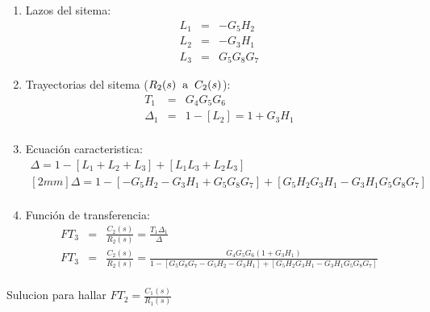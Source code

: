 \documentclass[12pt]{article}
\begin{document}
\begin{enumerate}
  \item Lazos del sitema:
    \begin{eqnarray*}
      L_{1} &=& - G_{5}H_{2} \\
      L_{2} &=& - G_{3}H_{1} \\
      L_{3} &=& G_{5}G_{8}G_{7}
    \end{eqnarray*}
  \item Trayectorias del sitema ($R_{2}(s) \hspace{2mm} \text{a} \hspace{2mm} C_{2}(s)$):
    \begin{eqnarray*}
      T_{1} &=& G_{4}G_{5}G_{6} \\
      \Delta_{1} &=& 1-[L_{2}]=1+G_{3}H_{1} \\
    \end{eqnarray*}
  \item Ecuaci\'on caracteristica:
    \begin{eqnarray*}
      \Delta = 1-[L_{1}+L_{2}+L_{3}]+[L_{1}L_{3}+L_{2}L_{3}] \\ [2mm]
      \Delta = 1-[-G_{5}H_{2}-G_{3}H_{1}+G_{5}G_{8}G_{7}]+[G_{5}H_{2}G_{3}H_{1}-G_{3}H_{1}G_{5}G_{8}G_{7}]\\
    \end{eqnarray*}
  \item Funci\'on de transferencia:
    \begin{eqnarray*}
      FT_{3} &=& \frac{C_{2}(s)}{R_{2}(s)}=\frac{T_{1}\Delta_{1}}{\Delta} \\[5mm]
      FT_{3} &=&\frac{C_{2}(s)}{R_{2}(s)} = \frac{G_{4}G_{5}G_{6}(1+G_{3}H_{1})}{1-[G_{5}G_{8}G_{7}-G_{5}H_{2}-G_{3}H_{1}]+[G_{5}H_{2}G_{3}H_{1}-G_{3}H_{1}G_{5}G_{8}G_{7}]} \\
    \end{eqnarray*}
\end{enumerate}

Sulucion para hallar \( \displaystyle FT_{2}=\frac{C_{1}(s)}{R_{1}(s)} \)
\end{document}
